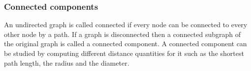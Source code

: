 \subsubsection{Connected components}

An undirected graph is called connected if every node can be connected to every other node by a path. If a graph is disconnected then a connected subgraph of the original graph is called a connected component. A connected component can be studied by computing different distance quantities for it such as the shortest path length, the radius and the diameter.

